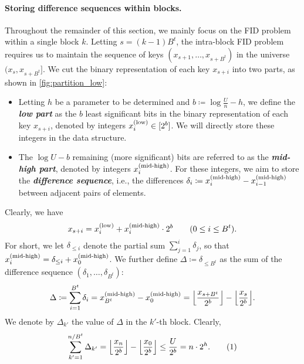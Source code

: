 \documentclass{article}
\theoremstyle{plain}
\theoremstyle{definition}  \newtheorem{definition}[theorem]{Definition}
\DeclarePairedDelimiter{\floor}{\lfloor}{\rfloor}
\DeclarePairedDelimiter{\bk}{(}{)}
\newcommand{\defeq}{\coloneqq}
\newcommand{\numberthis}{\addtocounter{equation}{1}\tag{\theequation}}
\newcommand{\xlow}[1][i]{x_{#1}^{(\textup{low})}}
\newcommand{\xmidhigh}[1][i]{x_{#1}^{(\textup{mid-high})}}
\newcommand{\defn}[1]{\emph{\textbf{#1}}}
\begin{document}
\paragraph*{Storing difference sequences within blocks.}
Throughout the remainder of this section, we mainly focus on the FID problem within a single block $k$. Letting $s = (k - 1) B^t$, the intra-block FID problem requires us to maintain the sequence of keys $(x_{s+1}, \ldots, x_{s + B^t})$ in the universe $(x_s, x_{s + B^t}]$. 
We cut the binary representation of each key $x_{s + i}$ into two parts, as shown in \cref{fig:partition_low}:
\begin{itemize}
\item Letting $h$ be a parameter to be determined and $b \defeq \log \frac{U}{n} - h$, we define the \defn{low part} as the $b$ least significant bits in the binary representation of each key $x_{s + i}$, denoted by integers $\xlow \in [2^b]$. We will directly store these integers in the data structure.
\item The $\log U - b$ remaining (more significant) bits are referred to as the \defn{mid-high part}, denoted by integers $\xmidhigh$. For these integers, we aim to store the \defn{difference sequence}, i.e., the differences $\delta_i \defeq \xmidhigh[i] - \xmidhigh[i-1]$ between adjacent pairs of elements.
\end{itemize}
Clearly, we have
\[ x_{s+i} = \xlow + \xmidhigh \cdot 2^b \qquad \bk{0 \le i \le B^t}. \]
For short, we let $\delta_{\le i}$ denote the partial sum $\sum_{j = 1}^i \delta_j$, so that $\xmidhigh[i] = \delta_{\le i} + \xmidhigh[0]$.
We further define $\Delta \defeq \delta_{\le B^t}$ as the sum of the difference sequence $(\delta_1, \ldots, \delta_{B^t})$:
\begin{align*}
  \Delta \defeq \sum_{i=1}^{B^t} \delta_i = \xmidhigh[B^t] - \xmidhigh[0] = \floor*{\frac{x_{s+B^t}}{2^b}} - \floor*{\frac{x_{s}}{2^b}}.
\end{align*}
We denote by $\Delta_{k'}$ the value of $\Delta$ in the $k'$-th block. Clearly,
\begin{align*}
  \label{ineq:sum_of_delta_k}
  \sum_{k'=1}^{n/B^t} \Delta_{k'} = \floor*{\frac{x_{n}}{2^b}} - \floor*{\frac{x_0}{2^b}} \le \frac{U}{2^b} = n\cdot 2^h.\numberthis
\end{align*}
\end{document}
